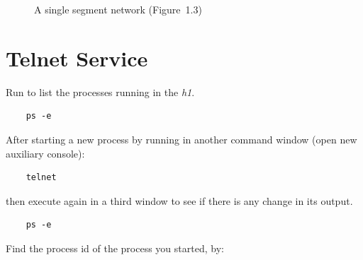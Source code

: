 \documentclass{../UTNetLab}
\begin{document}
\begin{center}
\begin{minipage}{0.48\textwidth}
\begin{flushright}
\begin{figure}[H]
                \caption{A single segment network (Figure~1.3)}
            \end{figure}
        \end{flushright}
    \end{minipage}
\end{center}

\section{Telnet Service}
Run  to list the processes running in the \textit{h1}.

\begin{lstlisting}
	ps -e
\end{lstlisting}

After starting a new process by running  in another command window (open new auxiliary console):

\begin{lstlisting}
	telnet
\end{lstlisting}

then execute  again in a third window to see if there is any change in its output.

\begin{lstlisting}
	ps -e
\end{lstlisting}

Find the process id of the  process you started, by:
\end{document}
